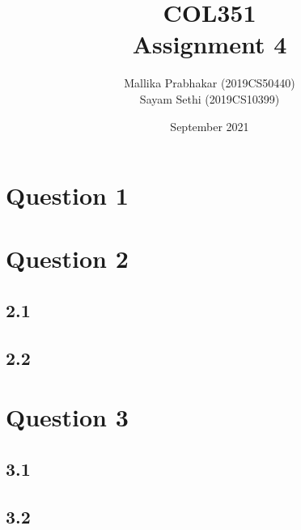 \documentclass[11pt]{article}
\title{COL351\\Assignment 4}
\author{Mallika Prabhakar (2019CS50440)\\Sayam Sethi (2019CS10399)}
\date{September 2021}
\begin{document}
\maketitle

\tableofcontents


\newpage
\section{Question 1}



\newpage
\section{Question 2}

\subsection{2.1}


\subsection{2.2}


\newpage
\section{Question 3}

\subsection{3.1}


\subsection{3.2}

\end{document}
